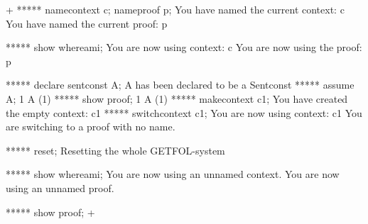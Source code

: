 



\gfexample+
   ***** namecontext c; nameproof p;
   You have named the current context: c
   You have named the current proof: p
   
   ***** show whereami;
   You are now using context: c
   You are now using the proof: p
   
   ***** declare sentconst A;
   A has been declared to be a Sentconst
   ***** assume A;
   1   A     (1)
   ***** show proof;
   1   A     (1)
   ***** makecontext c1;
   You have created the empty context: c1
   ***** switchcontext c1;
   You are now using context: c1
   You are switching to a proof with no name.
   
   ***** reset;
   Resetting the whole GETFOL-system
   
   ***** show whereami;
   You are now using an unnamed context.
   You are now using an unnamed proof.
   
   ***** show proof;
+
